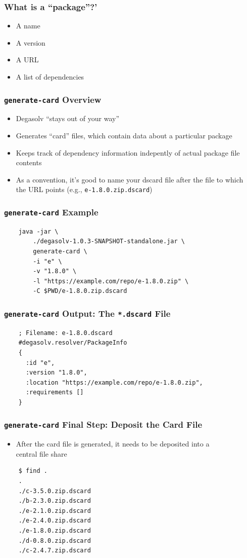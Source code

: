 \documentclass{beamer}
\begin{document}
\begin{frame}
  \frametitle{What is a ``package''?'}
  \begin{itemize}
  \item A name
  \item A version
  \item A URL
  \item A list of dependencies
  \end{itemize}
\end{frame}
\begin{frame}
  \frametitle{\texttt{generate-card} Overview}
  \begin{itemize}
  \item Degasolv ``stays out of your way''
  \item Generates ``card'' files, which contain data about a particular package
  \item Keeps track of dependency information indepently of actual package file contents
  \item As a convention, it's good to name your dscard file after the file to which \\
    the URL points (e.g., \texttt{e-1.8.0.zip.dscard})
  \end{itemize}
\end{frame}
\begin{frame}[fragile]
  \frametitle{\texttt{generate-card} Example}
  \begin{verbatim}
    java -jar \
        ./degasolv-1.0.3-SNAPSHOT-standalone.jar \
        generate-card \
        -i "e" \
        -v "1.8.0" \
        -l "https://example.com/repo/e-1.8.0.zip" \
        -C $PWD/e-1.8.0.zip.dscard
  \end{verbatim}
\end{frame}
\begin{frame}[fragile]
  \frametitle{\texttt{generate-card} Output: The \texttt{*.dscard} File}
  \begin{verbatim}
    ; Filename: e-1.8.0.dscard
    #degasolv.resolver/PackageInfo
    {
      :id "e",
      :version "1.8.0",
      :location "https://example.com/repo/e-1.8.0.zip",
      :requirements []
    }
  \end{verbatim}
\end{frame}
\begin{frame}[fragile]
  \frametitle{\texttt{generate-card} Final Step: Deposit the Card File}
  \begin{itemize}
  \item After the card file is generated, it needs to be deposited into a \\
    central file share
  \end{itemize}
\begin{verbatim}
    $ find .
    .
    ./c-3.5.0.zip.dscard
    ./b-2.3.0.zip.dscard
    ./e-2.1.0.zip.dscard
    ./e-2.4.0.zip.dscard
    ./e-1.8.0.zip.dscard
    ./d-0.8.0.zip.dscard
    ./c-2.4.7.zip.dscard
\end{verbatim}
\end{frame}
\end{document}
